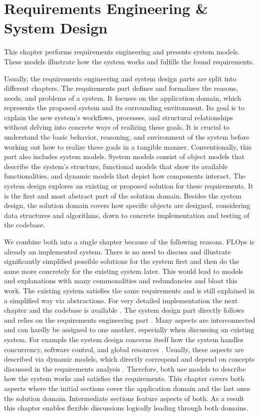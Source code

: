 \chapter{Requirements Engineering \& System Design}

This chapter performs requirements engineering and presents system models.
These models illustrate how the system works and fulfills the found requirements.

Usually, the requirements engineering and system design parts are split into different chapters.
The requirements part defines and formalizes the reasons, needs, and problems of a system.
It focuses on the application domain, which represents the proposed system and its surrounding environment.
Its goal is to explain the new system's workflows, processes, and structural relationships without delving into concrete ways of realizing these goals.
It is crucial to understand the basic behavior, reasoning, and environment of the system before working out how to realize these goals in a tangible manner.
Conventionally, this part also includes system models.
System models consist of object models that describe the system's structure, functional models that show its available functionalities, and dynamic models that depict how components interact.
The system design explores an existing or proposed solution for these requirements.
It is the first and most abstract part of the solution domain.
Besides the system design, the solution domain covers how specific objects are designed, considering data structures and algorithms, down to concrete implementation and testing of the codebase. \cite{book:bruegge}

We combine both into a single chapter because of the following reasons.
FLOps is already an implemented system.
There is no need to discuss and illustrate significantly simplified possible solutions for the system first and then do the same more concretely for the existing system later.
This would lead to models and explanations with many commonalities and redundancies and bloat this work.
The existing system satisfies the same requirements and is still explained in a simplified way via abstractions.
For very detailed implementation the next chapter and the codebase is available \cite{flops_code}.
The system design part directly follows and relies on the requirements engineering part \cite{book:bruegge}.
Many aspects are interconnected and can hardly be assigned to one another, especially when discussing an existing system.
For example the system design concerns itself how the system handles concurrency, software control, and global resources \cite{book:bruegge}.
Usually, these aspects are described via dynamic models, which directly correspond and depend on concepts discussed in the requirements analysis \cite{book:bruegge}.
Therefore, both use models to describe how the system works and satisfies the requirements.
This chapter covers both aspects where the initial sections cover the application domain and the last ones the solution domain.
Intermediate sections feature aspects of both. 
As a result this chapter enables flexible discussions logically leading through both domains.



